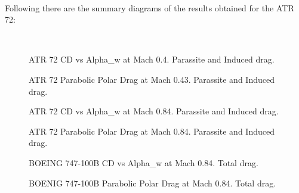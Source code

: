 \noindent \\

Following there are the summary diagrams of the results obtained for the ATR 72:

\noindent \\

\begin{figure}[H]
\centering

\caption{ATR 72 CD vs Alpha_w at Mach 0.4. Parassite and Induced drag.}
\label{fig:DragATR}
\end{figure}


\begin{figure}[H]
\centering

\caption{ATR 72 Parabolic Polar Drag at Mach 0.43. Parassite and Induced drag.}
\label{fig:DragATR}
\end{figure}

%
%
%
%

%
%
%
%
%
%
% 
% 
%	 	 


\begin{figure}[H]
\centering

\caption{ATR 72 CD vs Alpha_w at Mach 0.84.  Parassite and Induced drag.}
\label{fig:DragATR}
\end{figure}


\begin{figure}[H]
\centering

\caption{ATR 72 Parabolic Polar Drag at Mach 0.84.  Parassite and Induced drag.}
\label{fig:DragATR}
\end{figure}

\begin{figure}[H]
\centering

\caption{BOEING 747-100B CD vs Alpha_w at Mach 0.84. Total drag.}
\label{fig:DragATR}
\end{figure}


\begin{figure}[H]
\centering

\caption{BOENIG 747-100B Parabolic Polar Drag at Mach 0.84. Total drag.}
\label{fig:DragATR}
\end{figure}


